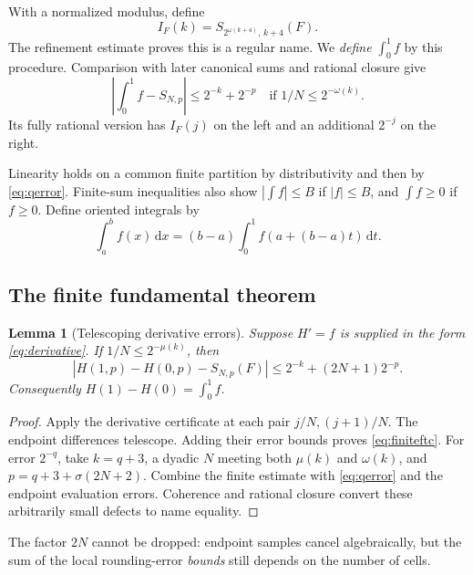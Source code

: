 \documentclass[11pt]{article}
\newtheorem{lemma}[theorem]{Lemma}
\theoremstyle{definition}
\newcommand{\dd}{\,\mathrm d}
\begin{document}
With a normalized modulus, define
\begin{equation}\label{eq:iname}
 I_F(k)=S_{2^{\omega(k+4)},\,k+4}(F).
\end{equation}
The refinement estimate proves this is a regular name. We
\emph{define} \(\int_0^1 f\) by this procedure. Comparison with later
canonical sums and rational closure give
\begin{equation}\label{eq:qerror}
 \left|\int_0^1 f-S_{N,p}\right|\le2^{-k}+2^{-p}
       \quad\text{if }1/N\le2^{-\omega(k)}.
\end{equation}
Its fully rational version has \(I_F(j)\) on the left and an additional
\(2^{-j}\) on the right.

Linearity holds on a common finite partition by distributivity and then
by \eqref{eq:qerror}. Finite-sum inequalities also show
\(|\int f|\le B\) if \(|f|\le B\), and \(\int f\ge0\) if \(f\ge0\).
Define oriented integrals by
\[
 \int_a^b f(x)\dd x=(b-a)\int_0^1 f(a+(b-a)t)\dd t.
\]

\subsection{The finite fundamental theorem}\label{sec:ftc}

\begin{lemma}[Telescoping derivative errors]\label{lem:ftc}
Suppose \(H'=f\) is supplied in the form \eqref{eq:derivative}.
If \(1/N\le2^{-\mu(k)}\), then
\begin{equation}\label{eq:finiteftc}
 |H(1,p)-H(0,p)-S_{N,p}(F)|
       \le2^{-k}+(2N+1)2^{-p}.
\end{equation}
Consequently \(H(1)-H(0)=\int_0^1 f\).
\end{lemma}
\begin{proof}
Apply the derivative certificate at each pair \(j/N,(j+1)/N\).
The endpoint differences telescope. Adding their error bounds proves
\eqref{eq:finiteftc}. For error \(2^{-q}\), take \(k=q+3\), a dyadic
\(N\) meeting both \(\mu(k)\) and \(\omega(k)\), and
\(p=q+3+\sigma(2N+2)\). Combine the finite estimate with
\eqref{eq:qerror} and the endpoint evaluation errors. Coherence and
rational closure convert these arbitrarily small defects to name equality.
\end{proof}

The factor \(2N\) cannot be dropped: endpoint samples cancel algebraically,
but the sum of the local rounding-error \emph{bounds} still depends on
the number of cells.
\end{document}
